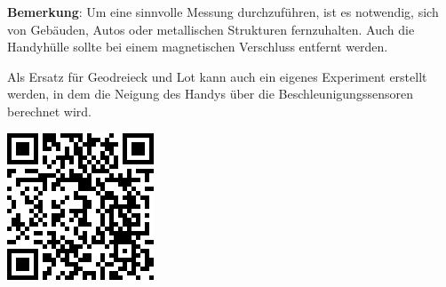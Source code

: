 \documentclass[../main.tex]{subfiles}
\begin{document}
\begin{tcolorbox}
\vspace{0.5cm}
    \textbf{Bemerkung}: Um eine sinnvolle Messung durchzuführen, ist es notwendig, sich von Gebäuden, Autos oder metallischen Strukturen fernzuhalten. Auch die Handyhülle sollte bei einem magnetischen Verschluss entfernt werden.\\
    \begin{minipage}[]{0.85\textwidth}
            Als Ersatz für Geodreieck und Lot kann auch ein eigenes Experiment erstellt werden, in dem die Neigung des Handys über die Beschleunigungssensoren berechnet wird.
  
        \end{minipage}
        \hspace{0.3cm}
        \begin{minipage}[]{0.1\textwidth}
            \includegraphics[width=\textwidth]{img/qr_code}
        \end{minipage}

    
\end{tcolorbox}
\end{document}
